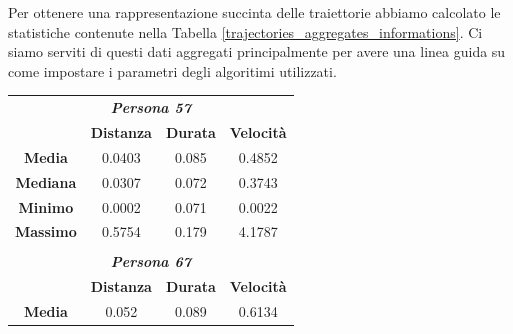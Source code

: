 \documentclass[12pt]{article}
\begin{document}
Per ottenere una rappresentazione succinta delle traiettorie abbiamo calcolato le statistiche contenute nella Tabella \ref{trajectories_aggregates_informations}.
Ci siamo serviti di questi dati aggregati principalmente per avere una linea guida su come impostare i parametri degli algoritimi utilizzati.

\begin{table}[!ht]
    \centering
    \begin{tabular}{cccc}
        \multicolumn{4}{c}{\textit{\textbf{Persona 57}}}                                                                                                                \\ \cline{2-4}
        \multicolumn{1}{c|}{}                  & \multicolumn{1}{c|}{\textbf{Distanza}} & \multicolumn{1}{c|}{\textbf{Durata}} & \multicolumn{1}{c|}{\textbf{Velocità}} \\ \hline
        \multicolumn{1}{|c|}{\textbf{Media}}   & \multicolumn{1}{c|}{0.0403}            & \multicolumn{1}{c|}{0.085}           & \multicolumn{1}{c|}{0.4852}            \\ \hline
        \multicolumn{1}{|c|}{\textbf{Mediana}} & \multicolumn{1}{c|}{0.0307}            & \multicolumn{1}{c|}{0.072}           & \multicolumn{1}{c|}{0.3743}            \\ \hline
        \multicolumn{1}{|c|}{\textbf{Minimo}}  & \multicolumn{1}{c|}{0.0002}            & \multicolumn{1}{c|}{0.071}           & \multicolumn{1}{c|}{0.0022}            \\ \hline
        \multicolumn{1}{|c|}{\textbf{Massimo}} & \multicolumn{1}{c|}{0.5754}            & \multicolumn{1}{c|}{0.179}           & \multicolumn{1}{c|}{4.1787}            \\ \hline
                                               &                                        &                                      &                                        \\
        \multicolumn{4}{c}{\textit{\textbf{Persona 67}}}                                                                                                                \\ \cline{2-4}
        \multicolumn{1}{c|}{}                  & \multicolumn{1}{c|}{\textbf{Distanza}} & \multicolumn{1}{c|}{\textbf{Durata}} & \multicolumn{1}{c|}{\textbf{Velocità}} \\ \hline
        \multicolumn{1}{|c|}{\textbf{Media}}   & \multicolumn{1}{c|}{0.052}             & \multicolumn{1}{c|}{0.089}           & \multicolumn{1}{c|}{0.6134}            \\ \hline

\end{tabular}
\end{table}
\end{document}
